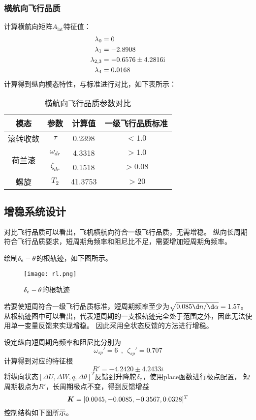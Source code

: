 \subsubsection{横航向飞行品质}
计算横航向矩阵$A_{\text{lat}}$特征值：
$$
\begin{aligned}
\lambda_0&=0\\
\lambda_{1}&=-2.8908\\
\lambda_{2,3}&=-0.6576\pm 4.2816{\mathrm i}\\
\lambda_{4}&=0.0168
\end{aligned}
$$
计算得到纵向模态特性，与标准进行对比，如下表所示：
\begin{table}[!h]
\centering
\caption{横航向飞行品质参数对比}
\begin{tabular}{@{}cccc@{}}
\toprule
模态&参数 & 计算值 & 一级飞行品质标准 \\ \midrule
滚转收敛&$\tau$&0.2398&$<1.0$\\ \midrule
\multirow{2}{*}{荷兰滚}&$\omega_{dr}$ & 4.3318 & $>1.0$ \\
&$\zeta_{dr}$ & 0.1518 & $>0.08$ \\ \midrule
螺旋&$T_2$ &41.3753 & $>20$ \\ \bottomrule
\end{tabular}
\end{table}
\clearpage
\subsection{增稳系统设计}
对比飞行品质可以看出，飞机横航向符合一级飞行品质，无需增稳。
纵向长周期符合飞行品质要求，短周期角频率和阻尼比不足，需要增加短周期角频率。

绘制${\delta_e}-\theta$的根轨迹，如下图所示。
\begin{figure}[!h]
\centering\texttt{[image: rl.png]}
\caption{${\delta_e}-\theta$的根轨迹}
\label{rl}
\end{figure}

若要使短周符合一级飞行品质标准，短周期频率至少为$\sqrt{0.085\d n/\d\alpha}=1.57$。
从根轨迹图中可以看出，代表短周期的一支根轨迹完全处于范围之外，因此无法使用单一变量反馈来实现增稳。
因此采用全状态反馈的方法进行增稳。

设定纵向短周期角频率和阻尼比分别为
$$\omega_{sp}'=6\ \ ,\ \ \zeta_{sp}'=0.707$$
计算得到对应的特征根
$$R'=-4.2420\pm4.2433i$$
将纵向状态$[\Delta U,\Delta W,q,\Delta\theta]^T$反馈到升降舵${\delta_e}$，使用place函数进行极点配置，
短周期极点为$R'$，长周期极点不变，得到反馈增益
$${\bm K}=[0.0045,-0.0085,-0.3567,0.0328]^T$$
控制结构如下图所示。

